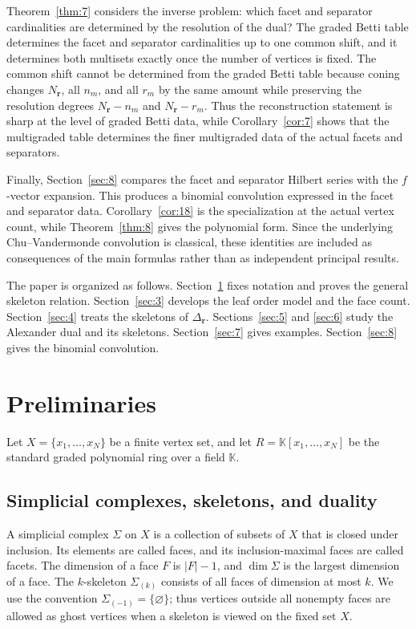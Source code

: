 \documentclass[11pt]{amsart}
\theoremstyle{definition}
\theoremstyle{remark}
\newcommand{\K}{\mathbb K}
\begin{document}
	Theorem~\ref{thm:7} considers the inverse problem: which facet and separator cardinalities are determined by the resolution of the dual? The graded Betti table determines the facet and separator cardinalities up to one common shift, and it determines both multisets exactly once the number of vertices is fixed. The common shift cannot be determined from the graded Betti table because coning changes $N_{\mathbf r}$, all $n_m$, and all $r_m$ by the same amount while preserving the resolution degrees $N_{\mathbf r}-n_m$ and $N_{\mathbf r}-r_m$. Thus the reconstruction statement is sharp at the level of graded Betti data, while Corollary~\ref{cor:7} shows that the multigraded table determines the finer multigraded data of the actual facets and separators.
	
	Finally, Section~\ref{sec:8} compares the facet and separator Hilbert series with the $f$-vector expansion. This produces a binomial convolution expressed in the facet and separator data. Corollary~\ref{cor:18} is the specialization at the actual vertex count, while Theorem~\ref{thm:8} gives the polynomial form. Since the underlying Chu--Vandermonde convolution is classical, these identities are included as consequences of the main formulas rather than as independent principal results.
	
	The paper is organized as follows. Section~\ref{sec:2} fixes notation and proves the general skeleton relation. Section~\ref{sec:3} develops the leaf order model and the face count. Section~\ref{sec:4} treats the skeletons of $\Delta_{\mathbf r}$. Sections~\ref{sec:5} and \ref{sec:6} study the Alexander dual and its skeletons. Section~\ref{sec:7} gives examples. Section~\ref{sec:8} gives the binomial convolution.
	
	\section{Preliminaries}\label{sec:2}
	
	Let $X=\{x_1,\ldots,x_N\}$ be a finite vertex set, and let $R=\K[x_1,\ldots,x_N]$ be the standard graded polynomial ring over a field $\K$.
	
	\subsection{Simplicial complexes, skeletons, and duality}
	
	A simplicial complex $\Sigma$ on $X$ is a collection of subsets of $X$ that is closed under inclusion. Its elements are called faces, and its inclusion-maximal faces are called facets. The dimension of a face $F$ is $|F|-1$, and $\dim\Sigma$ is the largest dimension of a face. The $k$-skeleton $\Sigma_{(k)}$ consists of all faces of dimension at most $k$. We use the convention $\Sigma_{(-1)}=\{\varnothing\}$; thus vertices outside all nonempty faces are allowed as ghost vertices when a skeleton is viewed on the fixed set $X$.
	
\end{document}
